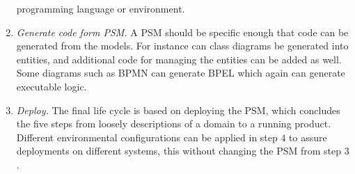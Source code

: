 \begin{enumerate}
    programming language or environment.
  \item \emph{Generate code form PSM.}
    A PSM should be specific enough that code can be generated from the models.
    For instance can class diagrams be generated into entities, and additional
    code for managing the entities can be added as well.
    Some diagrams such as BPMN can generate BPEL which again can generate executable logic.
  \item \emph{Deploy.}
    The final life cycle is based on deploying the PSM, which concludes the five steps from
    loosely descriptions of a domain to a running product.
    Different environmental configurations can be applied in step $4$ to assure deployments
    on different systems, this without changing the PSM from step $3$.
\end{enumerate}
